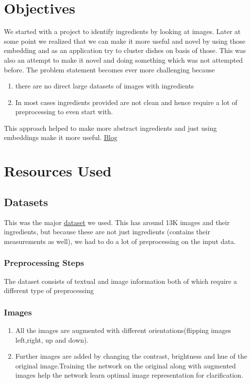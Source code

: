 \documentclass{article}
\begin{document}
\section{Objectives}

We started with a project to identify ingredients by looking at images. Later at some point we realized that we can make it more useful and novel by using those
embedding and as an application try to cluster dishes on basis of those. This was also an attempt to make it novel and doing something which was not attempted before. The problem statement becomes ever more challenging because 
\begin{enumerate}
    \item there are no direct large datasets of images with ingredients 
    \item In most cases ingredients provided are not clean and hence require a lot of preprocessing to even start with.
\end{enumerate} 
This approach helped to make more abstract ingredients and just using embeddings make it more useful. \href{https://cloud.google.com/architecture/overview-extracting-and-serving-feature-embeddings-for-machine-learning}{Blog}

\section{Resources Used}
\subsection{Datasets}
This was the major \href{https://www.kaggle.com/pes12017000148/food-ingredients-and-recipe-dataset-with-images}{dataset} we used. This has around 13K images and their ingredients, but because these are not just ingredients (contains their measurements as well), we had to do a lot of preprocessing on the input data. 

\subsubsection{Preprocessing Steps}
The dataset consists of textual and image information both of which require a different type of preprocessing

\subsubsection{Images}
\begin{enumerate}
    \item All the images are augmented with different orientations(flipping images left,right, up and down).
    \item Further images are added by changing the contrast, brightness and hue of the original image.Training the network on the original along with augmented images help the network learn optimal image representation for clarification.
\end{enumerate}
\end{document}
